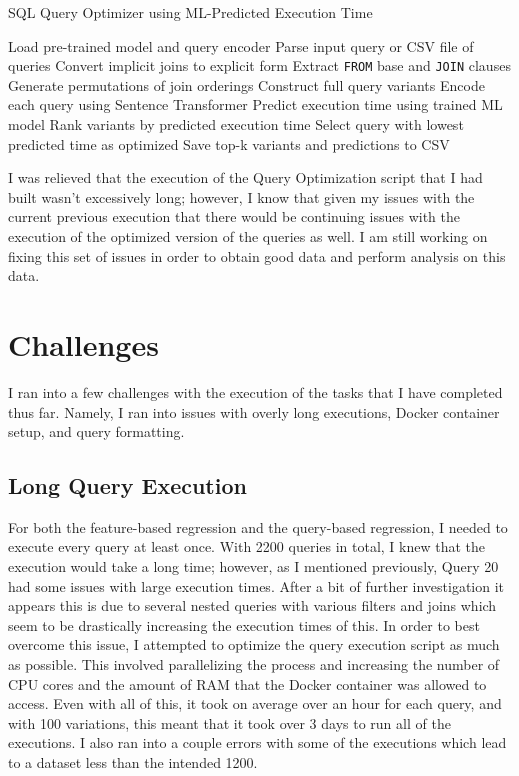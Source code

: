 \documentclass[sigconf]{acmart}
\begin{document}
\begin{algorithm}[H]
\caption{SQL Query Optimizer using ML-Predicted Execution Time}
\label{alg:query-optimizer}
\begin{algorithmic}[1]
\STATE Load pre-trained model and query encoder
\STATE Parse input query or CSV file of queries
    \STATE Convert implicit joins to explicit form
    \STATE Extract \texttt{FROM} base and \texttt{JOIN} clauses
    \STATE Generate permutations of join orderings
    \STATE Construct full query variants
    \STATE Encode each query using Sentence Transformer
    \STATE Predict execution time using trained ML model
    \STATE Rank variants by predicted execution time
    \STATE Select query with lowest predicted time as optimized
    \STATE Save top-k variants and predictions to CSV
\ENDFOR
\end{algorithmic}
\end{algorithm}

I was relieved that the execution of the Query Optimization script that I had built wasn't excessively long; however, I know that given my issues with the current previous execution that there
would be continuing issues with the execution of the optimized version of the queries as well. I am still working on fixing this set of issues in order to obtain good data and perform analysis 
on this data.

\section{Challenges}
I ran into a few challenges with the execution of the tasks that I have completed thus far. Namely, I ran into issues with overly long executions, Docker container setup, and query formatting.

\subsection{Long Query Execution}
For both the feature-based regression and the query-based regression, I needed to execute every query at least once. With 2200 queries in total, I knew that the execution would
take a long time; however, as I mentioned previously, Query 20 had some issues with large execution times. After a bit of further investigation it appears this is due to several nested
queries with various filters and joins which seem to be drastically increasing the execution times of this. In order to best overcome this issue, I attempted to optimize the query execution
script as much as possible. This involved parallelizing the process and increasing the number of CPU cores and the amount of RAM that the Docker container was allowed to access.
Even with all of this, it took on average over an hour for each query, and with 100 variations, this meant that it took over 3 days to run all of the executions. I also ran into a couple errors
with some of the executions which lead to a dataset less than the intended 1200.
\end{document}

